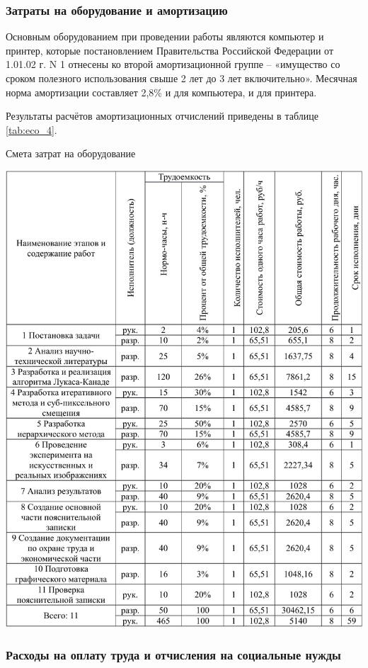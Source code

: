 \subsubsection{Затраты на оборудование и амортизацию}

Основным оборудованием при проведении работы являются компьютер и принтер, которые постановлением Правительства Российской Федерации от 1.01.02 г. N 1 отнесены ко второй амортизационной группе – «имущество со сроком полезного использования свыше 2 лет до 3 лет включительно». Месячная норма амортизации составляет 2,8\% и для компьютера, и для принтера.

Результаты расчётов амортизационных отчислений приведены в таблице \ref{tab:eco_4}.

\begin{table}[!ht]
\caption{Смета затрат на оборудование}
\centering
\includegraphics[page=4, width=1\linewidth]{econom_table.pdf}
\label{tab:eco_4}
\end{table}

\subsubsection{Расходы на оплату труда и отчисления на социальные нужды}

